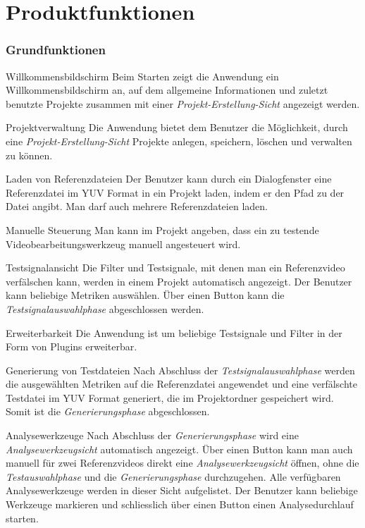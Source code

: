 \chapter {Produktfunktionen}

\subsection{Grundfunktionen}

\newItemPF Willkommensbildschirm
\newline
Beim Starten zeigt die Anwendung ein Willkommensbildschirm an, auf dem allgemeine Informationen und zuletzt benutzte Projekte zusammen mit einer \emph{Projekt-Erstellung-Sicht} angezeigt werden.

\newItemPF Projektverwaltung
\newline
Die Anwendung bietet dem Benutzer die Möglichkeit, durch eine \emph{Projekt-Erstellung-Sicht} Projekte anlegen, speichern, löschen und verwalten zu können.

\newItemPF Laden von Referenzdateien
\newline
Der Benutzer kann durch ein Dialogfenster eine Referenzdatei im YUV Format in ein Projekt laden, indem er den Pfad zu der Datei angibt. Man darf auch mehrere Referenzdateien laden.

\newItemPF Manuelle Steuerung
\newline
Man kann im Projekt angeben, dass ein zu testende Videobearbeitungswerkzeug manuell angesteuert wird.

\newItemPF Testsignalansicht
\newline
Die Filter und Testsignale, mit denen man ein Referenzvideo verfälschen kann, werden in einem Projekt automatisch angezeigt. Der Benutzer kann beliebige Metriken auswählen. Über einen Button kann die \emph{Testsignalauswahlphase} abgeschlossen werden.

\newItemPF Erweiterbarkeit
\newline
Die Anwendung ist um beliebige Testsignale und Filter in der Form von Plugins erweiterbar.

\newItemPF Generierung von Testdateien
\newline
Nach Abschluss der \emph{Testsignalauswahlphase} werden die ausgewählten Metriken auf die Referenzdatei angewendet und eine verfälschte Testdatei im YUV Format generiert, die im Projektordner gespeichert wird. Somit ist die \emph{Generierungsphase} abgeschlossen.

\newItemPF Analysewerkzeuge
\newline
Nach Abschluss der \emph{Generierungsphase} wird eine \emph{Analysewerkzeugsicht} automatisch angezeigt. Über einen Button kann man auch manuell für zwei Referenzvideos direkt eine \emph{Analysewerkzeugsicht} öffnen, ohne die \emph{Testauswahlphase} und die \emph{Generierungsphase} durchzugehen. Alle verfügbaren Analysewerkzeuge werden in dieser Sicht aufgelistet. Der Benutzer kann beliebige Werkzeuge markieren und schliesslich über einen Button einen Analysedurchlauf starten.

